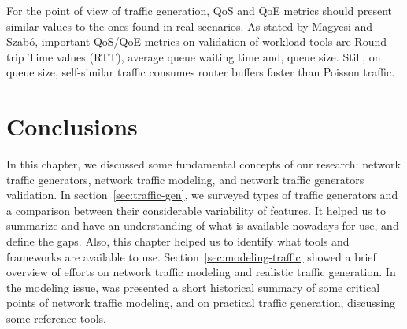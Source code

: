 For the point of view of traffic generation, QoS and QoE metrics should present similar values to the ones found in real scenarios. As stated by Magyesi and Szabó\cite{validate-trafficgen}, important QoS/QoE metrics on validation of workload tools are Round trip Time values (\acrfull{RTT}), average queue waiting time and, queue size. Still, on queue size, self-similar traffic consumes router buffers faster than Poisson traffic\cite{multi-player-online-game-self-similarity}.

\section{Conclusions}


In this chapter, we discussed some fundamental concepts of our research: network traffic generators, network traffic modeling, and network traffic generators validation. In section~\ref{sec:traffic-gen}, we surveyed types of traffic generators and a comparison between their considerable variability of features. It helped us to summarize and have an understanding of what is available nowadays for use, and define the gaps. Also, this chapter helped us to identify what tools and frameworks are available to use. Section~\ref{sec:modeling-traffic} showed a brief overview of efforts on network traffic modeling and realistic traffic generation. In the modeling issue, was presented a short historical summary of some critical points of network traffic modeling, and on practical traffic generation, discussing some reference tools.


